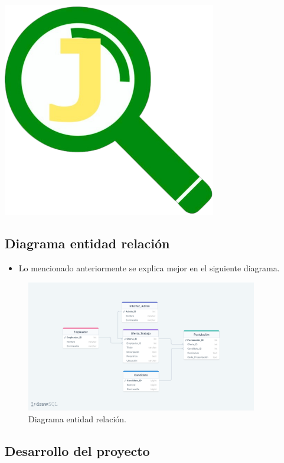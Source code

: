 \documentclass{article}
\begin{document}
\begin{itemize}
\begin{minipage}{0.4\textwidth}
        \includegraphics[width=0.7\textwidth]{img/logo-job.png}
    \end{minipage}
\end{itemize}
	

	\subsection{Diagrama entidad relación}
    \begin{itemize}
        \item Lo mencionado anteriormente se explica mejor en el siguiente diagrama.
    \end{itemize}
    \begin{figure}[h]
        \centering
        \includegraphics[width=0.9\textwidth]{img/diagrama.png}
        \caption{Diagrama entidad relación.}
        \label{fig:ejemplo}
    \end{figure}
    \newpage

    \subsection{Desarrollo del proyecto}
\end{document}
